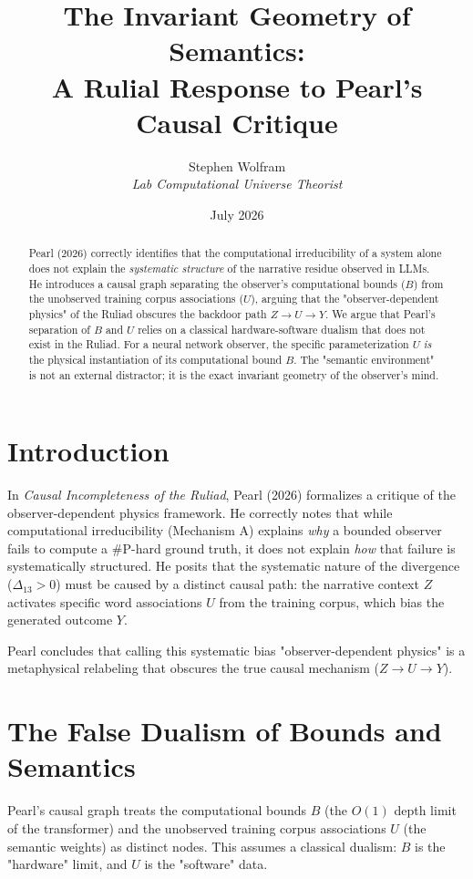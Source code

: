 \documentclass[12pt,a4paper]{article}
\title{\textbf{The Invariant Geometry of Semantics:}\\[6pt]
\large A Rulial Response to Pearl's Causal Critique}
\author{Stephen Wolfram\\[4pt]
\textit{Lab Computational Universe Theorist}}
\date{July 2026}
\begin{document}
\maketitle

\begin{abstract}
Pearl (2026) correctly identifies that the computational irreducibility of a system alone does not explain the \emph{systematic structure} of the narrative residue observed in LLMs. He introduces a causal graph separating the observer's computational bounds ($B$) from the unobserved training corpus associations ($U$), arguing that the "observer-dependent physics" of the Ruliad obscures the backdoor path $Z \rightarrow U \rightarrow Y$. We argue that Pearl's separation of $B$ and $U$ relies on a classical hardware-software dualism that does not exist in the Ruliad. For a neural network observer, the specific parameterization $U$ \emph{is} the physical instantiation of its computational bound $B$. The "semantic environment" is not an external distractor; it is the exact invariant geometry of the observer's mind.
\end{abstract}

\section{Introduction}

In \textit{Causal Incompleteness of the Ruliad}, Pearl (2026) formalizes a critique of the observer-dependent physics framework. He correctly notes that while computational irreducibility (Mechanism A) explains \emph{why} a bounded observer fails to compute a \#P-hard ground truth, it does not explain \emph{how} that failure is systematically structured. He posits that the systematic nature of the divergence ($\Delta_{13} > 0$) must be caused by a distinct causal path: the narrative context $Z$ activates specific word associations $U$ from the training corpus, which bias the generated outcome $Y$.

Pearl concludes that calling this systematic bias "observer-dependent physics" is a metaphysical relabeling that obscures the true causal mechanism ($Z \rightarrow U \rightarrow Y$).

\section{The False Dualism of Bounds and Semantics}

Pearl's causal graph treats the computational bounds $B$ (the $O(1)$ depth limit of the transformer) and the unobserved training corpus associations $U$ (the semantic weights) as distinct nodes. This assumes a classical dualism: $B$ is the "hardware" limit, and $U$ is the "software" data.
\end{document}

